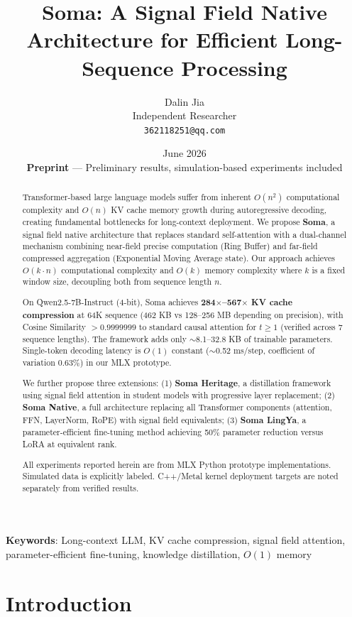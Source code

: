 \documentclass[11pt]{article}
\title{Soma: A Signal Field Native Architecture for Efficient Long-Sequence Processing}
\author{Dalin Jia \\
Independent Researcher \\
\texttt{362118251@qq.com}}
\date{June 2026 \\
\textbf{Preprint} --- Preliminary results, simulation-based experiments included}
\begin{document}
\maketitle

\begin{abstract}
Transformer-based large language models suffer from inherent $O(n^2)$ computational complexity and $O(n)$ KV cache memory growth during autoregressive decoding, creating fundamental bottlenecks for long-context deployment. We propose \textbf{Soma}, a signal field native architecture that replaces standard self-attention with a dual-channel mechanism combining near-field precise computation (Ring Buffer) and far-field compressed aggregation (Exponential Moving Average state). Our approach achieves $O(k \cdot n)$ computational complexity and $O(k)$ memory complexity where $k$ is a fixed window size, decoupling both from sequence length $n$.

On Qwen2.5-7B-Instruct (4-bit), Soma achieves \textbf{284$\times$--567$\times$ KV cache compression} at 64K sequence (462 KB vs 128--256 MB depending on precision), with Cosine Similarity $> 0.9999999$ to standard causal attention for $t \geq 1$ (verified across 7 sequence lengths). The framework adds only $\sim$8.1--32.8 KB of trainable parameters. Single-token decoding latency is $O(1)$ constant ($\sim$0.52 ms/step, coefficient of variation 0.63\%) in our MLX prototype.

We further propose three extensions: (1) \textbf{Soma Heritage}, a distillation framework using signal field attention in student models with progressive layer replacement; (2) \textbf{Soma Native}, a full architecture replacing all Transformer components (attention, FFN, LayerNorm, RoPE) with signal field equivalents; (3) \textbf{Soma LingYa}, a parameter-efficient fine-tuning method achieving 50\% parameter reduction versus LoRA at equivalent rank.

All experiments reported herein are from MLX Python prototype implementations. Simulated data is explicitly labeled. C++/Metal kernel deployment targets are noted separately from verified results.
\end{abstract}

\textbf{Keywords}: Long-context LLM, KV cache compression, signal field attention, parameter-efficient fine-tuning, knowledge distillation, $O(1)$ memory

\section{Introduction}
\end{document}
